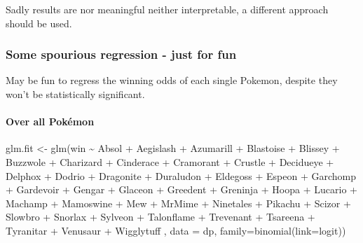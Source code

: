 \documentclass[
]{article}
\newenvironment{Shaded}{\begin{snugshade}}{\end{snugshade}}
\newcommand{\AttributeTok}[1]{\textcolor[rgb]{0.77,0.63,0.00}{#1}}
\newcommand{\FunctionTok}[1]{\textcolor[rgb]{0.00,0.00,0.00}{#1}}
\newcommand{\NormalTok}[1]{#1}
\newcommand{\OtherTok}[1]{\textcolor[rgb]{0.56,0.35,0.01}{#1}}
\newcommand{\SpecialCharTok}[1]{\textcolor[rgb]{0.00,0.00,0.00}{#1}}
\newcommand{\StringTok}[1]{\textcolor[rgb]{0.31,0.60,0.02}{#1}}
\begin{document}
Sadly results are nor meaningful neither interpretable, a different
approach should be used.

\hypertarget{some-spourious-regression---just-for-fun}{%
\subsubsection{Some spourious regression - just for
fun}\label{some-spourious-regression---just-for-fun}}

May be fun to regress the winning odds of each single Pokemon, despite
they won't be statistically significant.

\hypertarget{over-all-pokuxe9mon}{%
\paragraph{Over all Pokémon}\label{over-all-pokuxe9mon}}

\begin{Shaded}
\begin{Highlighting}[]
\NormalTok{glm.fit }\OtherTok{\textless{}{-}} \FunctionTok{glm}\NormalTok{(win }\SpecialCharTok{\textasciitilde{}}\NormalTok{ Absol }\SpecialCharTok{+}\NormalTok{ Aegislash }\SpecialCharTok{+}\NormalTok{ Azumarill }\SpecialCharTok{+}\NormalTok{ Blastoise }\SpecialCharTok{+}\NormalTok{ Blissey }\SpecialCharTok{+}\NormalTok{ Buzzwole }\SpecialCharTok{+}\NormalTok{ Charizard }\SpecialCharTok{+}\NormalTok{ Cinderace }\SpecialCharTok{+}\NormalTok{ Cramorant }\SpecialCharTok{+}\NormalTok{ Crustle }\SpecialCharTok{+}\NormalTok{ Decidueye }\SpecialCharTok{+}\NormalTok{ Delphox }\SpecialCharTok{+}\NormalTok{ Dodrio }\SpecialCharTok{+}\NormalTok{ Dragonite }\SpecialCharTok{+}\NormalTok{ Duraludon }\SpecialCharTok{+}\NormalTok{ Eldegoss }\SpecialCharTok{+}\NormalTok{ Espeon }\SpecialCharTok{+}\NormalTok{ Garchomp }\SpecialCharTok{+}\NormalTok{ Gardevoir }\SpecialCharTok{+}\NormalTok{ Gengar }\SpecialCharTok{+}\NormalTok{ Glaceon }\SpecialCharTok{+}\NormalTok{ Greedent }\SpecialCharTok{+}\NormalTok{ Greninja }\SpecialCharTok{+}\NormalTok{ Hoopa }\SpecialCharTok{+}\NormalTok{ Lucario }\SpecialCharTok{+}\NormalTok{ Machamp }\SpecialCharTok{+}\NormalTok{ Mamoswine }\SpecialCharTok{+}\NormalTok{ Mew }\SpecialCharTok{+}\NormalTok{ MrMime }\SpecialCharTok{+}\NormalTok{ Ninetales }\SpecialCharTok{+}\NormalTok{ Pikachu }\SpecialCharTok{+}\NormalTok{ Scizor }\SpecialCharTok{+}\NormalTok{ Slowbro }\SpecialCharTok{+}\NormalTok{ Snorlax }\SpecialCharTok{+}\NormalTok{ Sylveon }\SpecialCharTok{+}\NormalTok{ Talonflame }\SpecialCharTok{+}\NormalTok{ Trevenant }\SpecialCharTok{+}\NormalTok{ Tsareena }\SpecialCharTok{+}\NormalTok{ Tyranitar }\SpecialCharTok{+}\NormalTok{ Venusaur }\SpecialCharTok{+}\NormalTok{ Wigglytuff}
\NormalTok{               , }\AttributeTok{data =}\NormalTok{ dp, }\AttributeTok{family=}\FunctionTok{binomial}\NormalTok{(}\AttributeTok{link=}\StringTok{\textquotesingle{}logit\textquotesingle{}}\NormalTok{))}
\end{Highlighting}
\end{Shaded}
\end{document}
